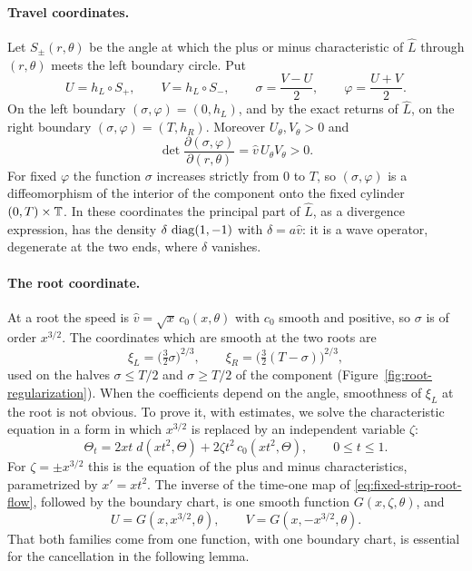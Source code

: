 \paragraph{Travel coordinates.}
Let $S_\pm(r,\theta)$ be the angle at which the plus or minus
characteristic of $\widehat L$ through $(r,\theta)$ meets the left
boundary circle. Put
\begin{equation}\label{eq:fixed-strip-coordinates}
 U=h_L\circ S_+,\qquad V=h_L\circ S_-,\qquad
 \sigma=\frac{V-U}2,\qquad\varphi=\frac{U+V}2 .
\end{equation}
On the left boundary $(\sigma,\varphi)=(0,h_L)$, and by the exact
returns of $\widehat L$, on the right boundary
$(\sigma,\varphi)=(T,h_R)$. Moreover $U_\theta,V_\theta>0$ and
\[
 \det\frac{\partial(\sigma,\varphi)}{\partial(r,\theta)}
 =\widehat v\,U_\theta V_\theta>0 .
\]
For fixed $\varphi$ the function $\sigma$ increases strictly from $0$
to $T$, so $(\sigma,\varphi)$ is a diffeomorphism of the interior of
the component onto the fixed cylinder $(0,T)\times\mathbb T$. In these
coordinates the principal part of $\widehat L$, as a divergence
expression, has the density $\delta\,\operatorname{diag}(1,-1)$ with
$\delta=a\widehat v$: it is a wave operator, degenerate at the two
ends, where $\delta$ vanishes.

\paragraph{The root coordinate.}
At a root the speed is $\widehat v=\sqrt x\,c_0(x,\theta)$ with $c_0$
smooth and positive, so $\sigma$ is of order $x^{3/2}$. The
coordinates which are smooth at the two roots are
\[
 \xi_L=\bigl(\tfrac32\sigma\bigr)^{2/3},\qquad
 \xi_R=\bigl(\tfrac32(T-\sigma)\bigr)^{2/3},
\]
used on the halves $\sigma\le T/2$ and $\sigma\ge T/2$ of the
component (Figure~\ref{fig:root-regularization}). When the
coefficients depend on the angle, smoothness of $\xi_L$ at the root
is not obvious. To prove it, with estimates, we solve the
characteristic equation in a form in which $x^{3/2}$ is replaced by an
independent variable $\zeta$:
\begin{equation}\label{eq:fixed-strip-root-flow}
 \Theta_t=2xt\;d(xt^2,\Theta)+2\zeta t^2\,c_0(xt^2,\Theta),
 \qquad 0\le t\le1 .
\end{equation}
For $\zeta=\pm x^{3/2}$ this is the equation of the plus and minus
characteristics, parametrized by $x'=xt^2$. The inverse of the
time-one map of \eqref{eq:fixed-strip-root-flow}, followed by the
boundary chart, is one smooth function $G(x,\zeta,\theta)$, and
\[
 U=G(x,x^{3/2},\theta),\qquad V=G(x,-x^{3/2},\theta).
\]
That both families come from one function, with one boundary chart,
is essential for the cancellation in the following lemma.

